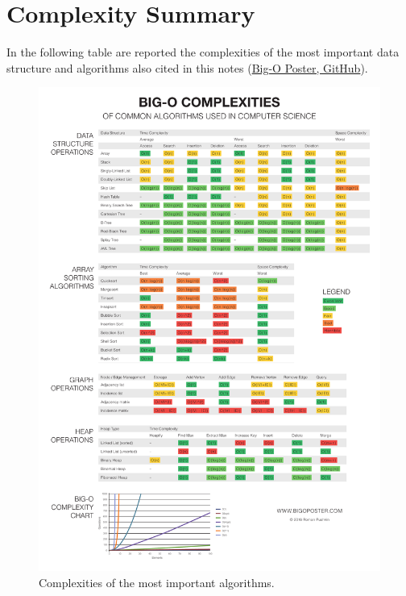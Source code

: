 \chapter{Complexity Summary}
\label{complexityappendix}

In the following table are reported the complexities of the most important data structure and algorithms also cited in this notes \cite{bigoposter} (\href{https://github.com/ro31337/bigoposter}{Big-O Poster, GitHub}).

\begin{figure}[H]
	\begin{center}
		\includegraphics[scale=0.31]{chapters/appendix/appcomplexity/images/bigoposter.pdf}
		\caption[Complexities of the most important algorithms.]{Complexities of the most important algorithms.}
	\end{center}
\end{figure}
 